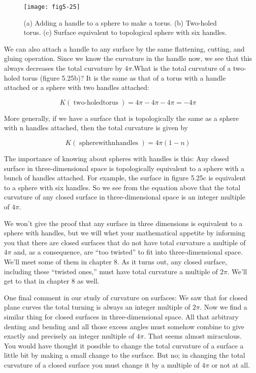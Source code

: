 \documentclass{book}
\begin{document}
\begin{figure}
\begin{center}
\texttt{[image: fig5-25]}
\caption{(a) Adding a handle to a sphere to make a torus. (b) Two-holed torus. (c) Surface equivalent to topological sphere with six handles.}
\end{center}
\end{figure}

We can also attach a handle to any surface by the same flattening,
cutting, and gluing operation. Since we know the curvature in the handle
now, we see that this always decreases the total curvature by $4 \pi$.What
is the total curvature of a two-holed torus (figure 5.25b)? It is the same
as that of a torus with a handle attached or a sphere with two handles
attached:

$$K(\operatorname{two-holed torus}) = 4 \pi - 4 \pi - 4 \pi= -4 \pi$$

More generally, if we have a surface that is topologically the same as a
sphere with n handles attached, then the total curvature is given by

$$K(\operatorname{sphere with n handles}) = 4 \pi (1 - n)$$

The importance of knowing about spheres with handles is this: Any
closed surface in three-dimensional space is topologically equivalent to
a sphere with a bunch of handles attached. For example, the surface
in figure 5.25c is equivalent to a sphere with six handles. So we see
from the equation above that the total curvature of any closed surface
in three-dimensional space is an integer multiple of $4\pi$.

We won't give the proof that any surface in three dimensions is equivalent to a sphere with handles, but we will whet your mathematical
appetite by informing you that there are closed surfaces that do not
have total curvature a multiple of $4 \pi$ and, as a consequence, are ``too
twisted'' to fit into three-dimensional space. We'll meet some of them in
chapter 8. As it turns out, any closed surface, including these ``twisted
ones,'' must have total curvature a multiple of $2 \pi$. We'll get to that in
chapter 8 as well.

One final comment in our study of curvature on surfaces: We saw that
for closed plane curves the total turning is always an integer multiple of
$2 \pi$. Now we find a similar thing for closed surfaces in three-dimensional
space. All that arbitrary denting and bending and all those excess angles
must somehow combine to give exactly and precisely an integer multiple
of $4 \pi$. That seems almost miraculous. You would have thought it
possible to change the total curvature of a surface a little bit by making
a small change to the surface. But no; in changing the total curvature
of a closed surface you must change it by a multiple of $4 \pi$ or not at all.
\end{document}

